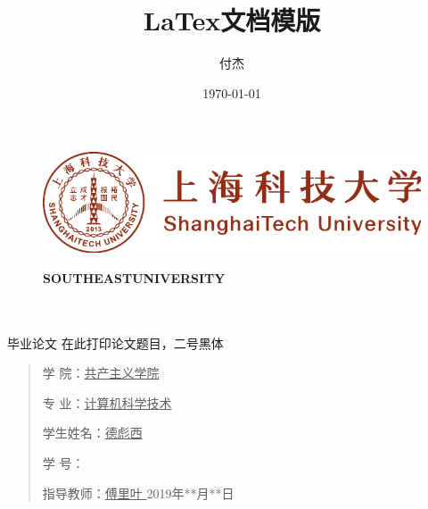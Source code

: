 \documentclass[a4paper, 12pt]{article}
\title{LaTex文档模版}
\author{付杰}
\date{\today}
\begin{document}



\begin{figure}[t]
		\parbox[b]{9cm}{
			\begin{center}
				\includegraphics[scale=0.8]{./images/shanghaitech-emblem.pdf}

				\small \textbf{SOUTHEAST\quad UNIVERSITY} 
			\end{center}
			}
	\end{figure}

	\begin{center}
		\quad \\
		\quad \\
		\heiti \fontsize{45}{17} 毕\quad 业\quad 论\quad 文
		\vskip 3.5cm
		\heiti {} 在此打印论文题目，二号黑体	
	\end{center}
	\vskip 3.5cm

	\begin{quotation}
		\songti \fontsize{15}{15}
		\doublespacing
		\par\setlength\parindent{12em}
		\quad 

		学\hspace{0.61cm} 院：\underline{共产主义学院\quad}

		专\hspace{0.61cm} 业：\underline{计算机科学技术}

		学生姓名：\underline{\qquad 德彪西\qquad }

		学\hspace{0.61cm} 号：\underline{\quad}

		指导教师：\underline{\qquad 傅里叶 \qquad}
		\vskip 2cm
		\centering
		2019年**月**日
	\end{quotation}

  \newpage
\end{document}
